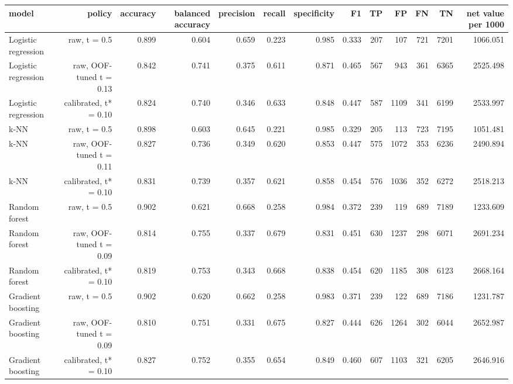 \begin{tabular}{lrrrrrrrrrrrr}
\toprule
model & policy & accuracy & balanced accuracy & precision & recall & specificity & F1 & TP & FP & FN & TN & net value per 1000 \\
\midrule
Logistic regression & raw, t = 0.5 & 0.899 & 0.604 & 0.659 & 0.223 & 0.985 & 0.333 & 207 & 107 & 721 & 7201 & 1066.051 \\
Logistic regression & raw, OOF-tuned t = 0.13 & 0.842 & 0.741 & 0.375 & 0.611 & 0.871 & 0.465 & 567 & 943 & 361 & 6365 & 2525.498 \\
Logistic regression & calibrated, t* = 0.10 & 0.824 & 0.740 & 0.346 & 0.633 & 0.848 & 0.447 & 587 & 1109 & 341 & 6199 & 2533.997 \\
k-NN & raw, t = 0.5 & 0.898 & 0.603 & 0.645 & 0.221 & 0.985 & 0.329 & 205 & 113 & 723 & 7195 & 1051.481 \\
k-NN & raw, OOF-tuned t = 0.11 & 0.827 & 0.736 & 0.349 & 0.620 & 0.853 & 0.447 & 575 & 1072 & 353 & 6236 & 2490.894 \\
k-NN & calibrated, t* = 0.10 & 0.831 & 0.739 & 0.357 & 0.621 & 0.858 & 0.454 & 576 & 1036 & 352 & 6272 & 2518.213 \\
Random forest & raw, t = 0.5 & 0.902 & 0.621 & 0.668 & 0.258 & 0.984 & 0.372 & 239 & 119 & 689 & 7189 & 1233.609 \\
Random forest & raw, OOF-tuned t = 0.09 & 0.814 & 0.755 & 0.337 & 0.679 & 0.831 & 0.451 & 630 & 1237 & 298 & 6071 & 2691.234 \\
Random forest & calibrated, t* = 0.10 & 0.819 & 0.753 & 0.343 & 0.668 & 0.838 & 0.454 & 620 & 1185 & 308 & 6123 & 2668.164 \\
Gradient boosting & raw, t = 0.5 & 0.902 & 0.620 & 0.662 & 0.258 & 0.983 & 0.371 & 239 & 122 & 689 & 7186 & 1231.787 \\
Gradient boosting & raw, OOF-tuned t = 0.09 & 0.810 & 0.751 & 0.331 & 0.675 & 0.827 & 0.444 & 626 & 1264 & 302 & 6044 & 2652.987 \\
Gradient boosting & calibrated, t* = 0.10 & 0.827 & 0.752 & 0.355 & 0.654 & 0.849 & 0.460 & 607 & 1103 & 321 & 6205 & 2646.916 \\
\bottomrule
\end{tabular}